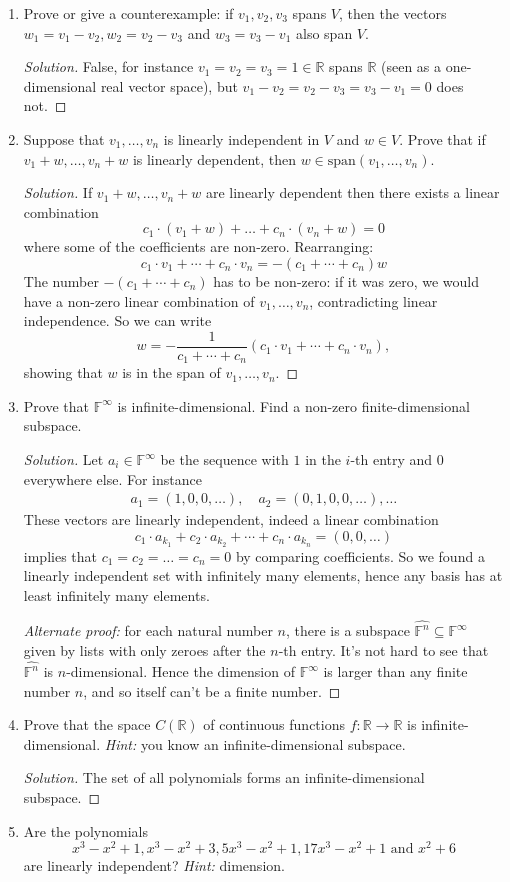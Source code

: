 \documentclass[a4paper,11pt]{article}
\theoremstyle{definition}
\newenvironment{solution}
  {\renewcommand\qedsymbol{$\blacksquare$}\begin{proof}[Solution]}
  {\end{proof}}
\begin{document}
\begin{enumerate}[(1)]
\item
Prove or give a counterexample:
if $v_1, v_2, v_3$ spans $V$, then the vectors
$w_1 = v_1 - v_2, w_2 = v_2 - v_3$ and $w_3 = v_3- v_1$ also span $V$.
\begin{solution}
False, for instance $v_1=v_2=v_3 = 1\in\mathbb R$ spans $\mathbb R$ (seen as a one-dimensional real vector space), but $v_1-v_2 = v_2-v_3 = v_3-v_1 = 0$ does not.
\end{solution}
\item 
Suppose that $v_1,\dots,v_n$ is linearly independent in $V$ and $w\in V$.
Prove that if $v_1+w,\dots,v_n+w$ is linearly dependent, then $w\in\text{span}(v_1,\dots,v_n)$.
\begin{solution}
If $v_1+w,\dots,v_n+w$ are linearly dependent then there exists a linear combination
\[
c_1\cdot (v_1+w)+\dots+c_n\cdot (v_n+w)=0
\]
where some of the coefficients are non-zero.
Rearranging:
\[
c_1\cdot v_1 +\cdots+ c_n\cdot v_n = -(c_1+\cdots+c_n)w
\]
The number $-(c_1+\cdots+c_n)$ has to be non-zero:
if it was zero, we would have a non-zero linear combination of $v_1,\dots,v_n$, contradicting linear independence.
So we can write
\[
w = -\frac{1}{c_1+\cdots+c_n}(c_1\cdot v_1 +\cdots+ c_n\cdot v_n),
\]
showing that $w$ is in the span of $v_1,\dots,v_n$.
\end{solution}


\item 
Prove that $\mathbb F^\infty$ is infinite-dimensional.
Find a non-zero finite-dimensional subspace.
\begin{solution}
Let $a_i\in\mathbb F^\infty$ be the sequence with $1$ in the $i$-th entry and $0$ everywhere else.
For instance
\begin{align*}
a_1 = (1,0,0,\dots),\quad a_2=(0,1,0,0,\dots),\dots
\end{align*}
These vectors are linearly independent, indeed a linear combination
\[
c_1\cdot a_{k_1}+c_2\cdot a_{k_2}+\cdots +c_n\cdot a_{k_n}=(0,0,\dots)
\]
implies that $c_1=c_2=\dots=c_n=0$ by comparing coefficients.
So we found a linearly independent set with infinitely many elements, hence any basis has at least infinitely many elements.

\noindent\textit{Alternate proof:}
for each natural number $n$, there is a subspace $\widehat{\mathbb F^n}\subseteq \mathbb F^\infty$ given by lists with only zeroes after the $n$-th entry.
It's not hard to see that $\widehat{\mathbb F^n}$ is $n$-dimensional.
Hence the dimension of $\mathbb F^\infty$ is larger than any finite number $n$, and so itself can't be a finite number.
\end{solution}
\item 
Prove that the space $C(\mathbb R)$ of continuous functions $f
:\mathbb R\to\mathbb R$ is infinite-dimensional.
\textit{Hint:} you know an infinite-dimensional subspace.
\begin{solution}
The set of all polynomials forms an infinite-dimensional subspace.
\end{solution}
\item
Are the polynomials
\[
x^3-x^2+1 ,x^3-x^2+3, 5x^3-x^2+1, 17x^3-x^2+1\text{ and } x^2+6
\]
are linearly independent? \textit{Hint:} dimension.


\end{enumerate}
\end{document}
